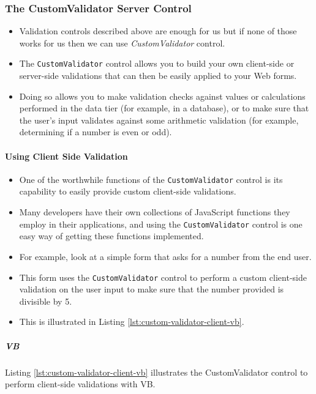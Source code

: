 \subsubsection{The CustomValidator Server Control}
\begin{itemize}
	\item Validation controls described above are enough for us but if none of those works for us then we can use \textit{CustomValidator} control.
	 \item The \texttt{CustomValidator} control allows you to build your own client-side or server-side validations that can then be easily applied to your Web forms. 
	 \item Doing so allows you to make validation checks against values or calculations performed in the data tier (for example, in a database), or to make sure that the user's input validates against some arithmetic validation (for example, determining if a number is even or odd).
\end{itemize}


\paragraph*{Using Client Side Validation}
\begin{itemize}
	\item One of the worthwhile functions of the \texttt{CustomValidator} control is its capability to easily provide custom client-side validations. 
	
	\item Many developers have their own collections of JavaScript functions they employ in their applications, and using the \texttt{CustomValidator} control is one easy way of getting these functions implemented.
	
	\item For example, look at a simple form that asks for a number from the end user. 
	\item This form uses the \texttt{CustomValidator} control to perform a custom client-side validation on the user input to make sure that the number provided is divisible by 5. 
	\item This is illustrated in Listing {\ref{lst:custom-validator-client-vb}}.
	
\end{itemize}

\subparagraph*{VB}
Listing {\ref{lst:custom-validator-client-vb}} illustrates the CustomValidator control to perform client-side validations with VB.

